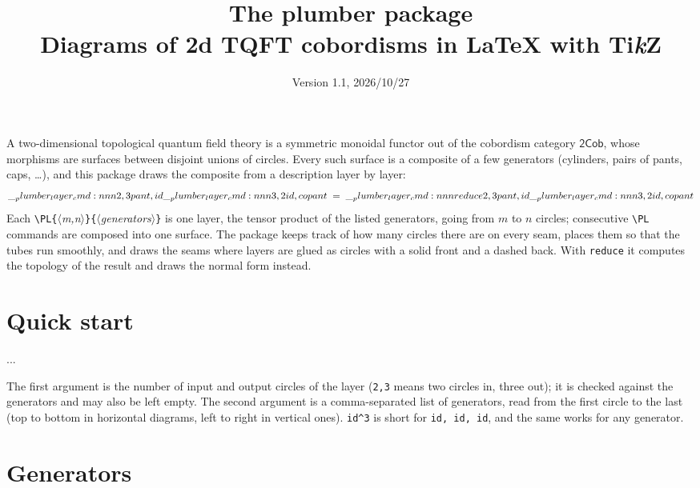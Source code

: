 \documentclass[11pt]{article}
\title{The \textsf{plumber} package\\[2pt]
  \large Diagrams of 2d TQFT cobordisms in \LaTeX{} with Ti\emph{k}Z}
\date{Version 1.1, 2026/10/27}
\author{}
\newenvironment{result}{\par\smallskip\noindent\hspace*{1em}}{\par\medskip}
\newcommand\opt[1]{\texttt{#1}}
\newcommand\cs[1]{\texttt{\textbackslash#1}}
\newcommand\meta[1]{\ensuremath{\langle}\textit{#1}\ensuremath{\rangle}}
\newcommand\marg[1]{\texttt{\{}\meta{#1}\texttt{\}}}
\begin{document}
\maketitle

\noindent
A two-dimensional topological quantum field theory is a symmetric monoidal
functor out of the cobordism category $\mathsf{2Cob}$, whose morphisms are
surfaces between disjoint unions of circles. Every such surface is a
composite of a few generators (cylinders, pairs of pants, caps, \dots), and
this package draws the composite from a description layer by layer:
\[
  \PL{2,3}{pant, id}\PL{3,2}{id, copant}
  \;=\; \PL[reduce]{2,3}{pant, id}\PL{3,2}{id, copant}
\]
Each \cs{PL}\marg{m,n}\marg{generators} is one layer, the tensor product of
the listed generators, going from $m$ to $n$ circles; consecutive \cs{PL}
commands are composed into one surface. The package keeps track of how many
circles there are on every seam, places them so that the tubes run smoothly,
and draws the seams where layers are glued as circles with a solid front and
a dashed back. With \opt{reduce} it computes the topology of the result and
draws the normal form instead.

\section{Quick start}

\begin{code}
\usepackage{plumber}   %
...
\end{code}
\begin{result}
\end{result}

The first argument is the number of input and output circles of the layer
(\verb|2,3| means two circles in, three out); it is checked against the
generators and may also be left empty. The second argument is a
comma-separated list of generators, read from the first circle to the last
(top to bottom in horizontal diagrams, left to right in vertical ones).
\verb|id^3| is short for \verb|id, id, id|, and the same works for any
generator.

\section{Generators}
\end{document}
